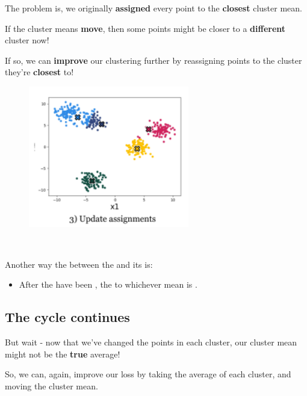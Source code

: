         The problem is, we originally \textbf{assigned} every point to the \textbf{closest} cluster mean. 
        
        If the cluster means \textbf{move}, then some points might be closer to a \textbf{different} cluster now!
        
        If so, we can \textbf{improve} our clustering further by reassigning points to the cluster they're \textbf{closest} to!
        
        \begin{figure}[H]
            \centering
            \includegraphics[width=70mm,scale=0.4]{images/clustering_images/update_assignments_clustering.png}
        \end{figure}\\
        
        \begin{concept}
            Another way  the  between the  and its  is:
            
            \begin{itemize}
                \item After the  have been ,  the  to whichever mean is .
            \end{itemize} 
        \end{concept}
        
    \subsection{The cycle continues}
    
        But wait - now that we've changed the points in each cluster, our cluster mean might not be the \textbf{true} average!
        
        So, we can, again, improve our loss by taking the average of each cluster, and moving the cluster mean.
        
